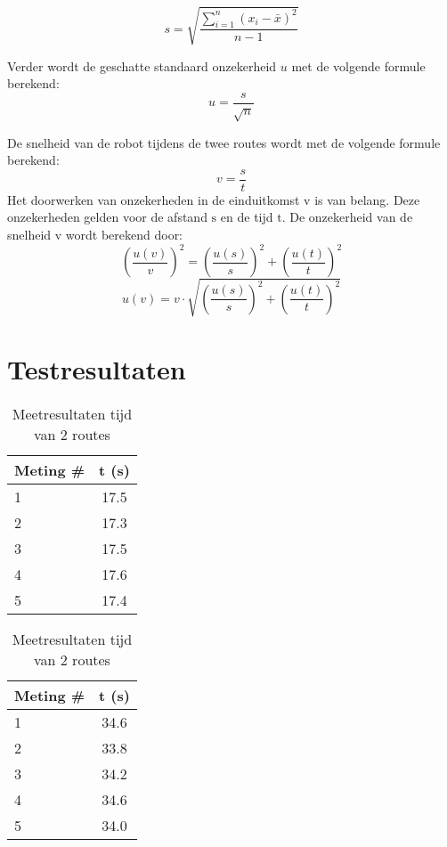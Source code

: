 \documentclass{report}
\begin{document}
\begin{equation} 
\label{eq:stddev}
s=\sqrt{\frac{\sum_{i=1}^{n}{(x_i-\bar{x})^2}}{n-1}}
\end{equation}

Verder wordt de geschatte standaard onzekerheid $u$ met de volgende formule berekend:
\begin{equation}
\label{eq:onzekerheid}
u=\frac{s}{\sqrt{n}}
\end{equation}

De snelheid van de robot tijdens de twee routes wordt met de volgende formule berekend:
\begin{equation}
\label{snelheid}
v=\frac{s}{t}
\end{equation}
Het doorwerken van onzekerheden in de einduitkomst $\mathrm{v}$ is van belang. Deze onzekerheden gelden voor de afstand $\mathrm{s}$ en de tijd $\mathrm{t}$. De onzekerheid van de snelheid $\mathrm{v}$ wordt berekend door:
\begin{equation}
\left(\frac{u(v)}{v}\right)^2=\left(\frac{u(s)}{s}\right)^2+\left(\frac{u(t)}{t}\right)^2
\end{equation}
\begin{equation}
\label{eq:onzSnelheid}
u(v)=v\cdot\sqrt{\left(\frac{u(s)}{s}\right)^2+\left(\frac{u(t)}{t}\right)^2}
\end{equation}

\section{Testresultaten}
\label{sec:testresultaten}

\begin{table}[H]
	\centering
	\begin{subtable}{0.40\textwidth}
		\centering
			\begin{tabular}{| l| c|}
		\hline
		   Meting \# & t (s) \\
		\hline
		   1& 17.5 \\
		\hline
		   2& 17.3 \\
		\hline
		   3& 17.5 \\
		\hline
		   4& 17.6 \\
		\hline
		   5& 17.4 \\
		\hline
		\end{tabular}
		\label{tab:timea}
	\end{subtable}
	\quad
	\begin{subtable}{0.40\textwidth}
		\centering
		\begin{tabular}{| l| c|}
		\hline
		   Meting \# & t (s) \\
		\hline
		   1& 34.6\\
		\hline
		   2& 33.8\\
		\hline
		   3& 34.2\\
		\hline
		  4& 34.6\\
		\hline
		   5& 34.0 \\
		\hline
		\end{tabular}
		\label{tab:timeb}
	\end{subtable}
	\caption{Meetresultaten tijd van 2 routes}
	\label{tab:measurementtime}
\end{table}
\end{document}

